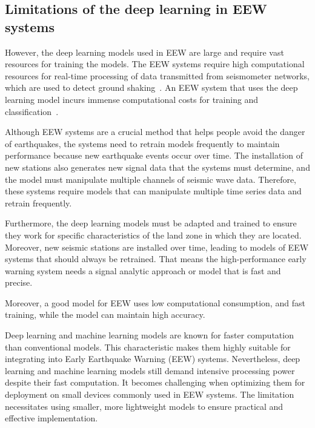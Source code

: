 \subsection{Limitations of the deep learning in EEW systems}
However, the deep learning models used in EEW are large and require vast resources for training the models. The EEW systems require high computational resources for real-time processing of data transmitted from seismometer networks, which are used to detect ground shaking~\cite{wu2021crowdquake+}. An EEW system that uses the deep learning model incurs immense computational costs for training and classification~\cite{li2018machine}.

Although EEW systems are a crucial method that helps people avoid the danger of earthquakes, the systems need to retrain models frequently to maintain performance because new earthquake events occur over time. The installation of new stations also generates new signal data that the systems must determine, and the model must manipulate multiple channels of seismic wave data. Therefore, these systems require models that can manipulate multiple time series data and retrain frequently.

Furthermore, the deep learning models must be adapted and trained to ensure they work for specific characteristics of the land zone in which they are located. Moreover, new seismic stations are installed over time, leading to models of EEW systems that should always be retrained. That means the high-performance early warning system needs a signal analytic approach or model that is fast and precise. 

Moreover, a good model for EEW uses low computational consumption, and fast training, while the model can maintain high accuracy.

Deep learning and machine learning models are known for faster computation than conventional models. This characteristic makes them highly suitable for integrating into Early Earthquake Warning (EEW) systems\cite{anikiev2022traveltime, maharjan2022deep,  lim2022leqnet, wu2021crowdquake+}. Nevertheless, deep learning and machine learning models still demand intensive processing power despite their fast computation. It becomes challenging when optimizing them for deployment on small devices commonly used in EEW systems. The limitation necessitates using smaller, more lightweight models to ensure practical and effective implementation\cite{wu2021crowdquake+, lim2022leqnet}.

